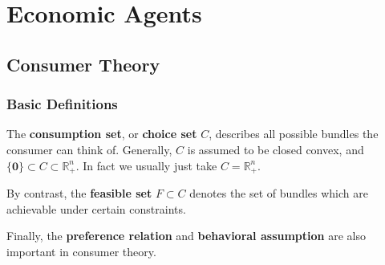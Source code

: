 \documentclass[openany]{book}
\theoremstyle{remark}
\begin{document}
\part{Economic Agents}
\chapter{Consumer Theory}
\section{Basic Definitions}
The \textbf{consumption set}, or \textbf{choice set} $C$, describes all possible bundles the consumer can think of. Generally, $C$ is assumed to be closed convex, and $\{\mathbf{0}\}\subset C\subset \mathbb{R}_+^n$. In fact we usually just take $C=\mathbb{R}_+^n$.

By contrast, the \textbf{feasible set} $F\subset C$ denotes the set of bundles which are achievable under certain constraints.

Finally, the \textbf{preference relation} and \textbf{behavioral assumption} are also important in consumer theory.
\end{document}
